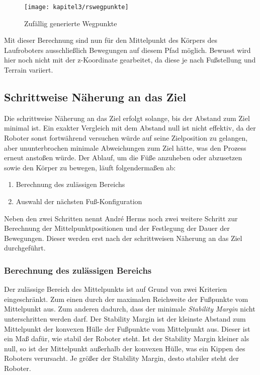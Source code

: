 \begin{figure}[t]
  \centering
  \texttt{[image: kapitel3/rswegpunkte]}
  \caption{Zufällig generierte Wegpunkte}
  \label{Kap3:RSWegpunkte}
\end{figure}

Mit dieser Berechnung sind nun für den Mittelpunkt des Körpers des Laufroboters ausschließlich Bewegungen auf diesem Pfad möglich. Bewusst wird hier noch nicht mit der z-Koordinate gearbeitet, da diese je nach Fußstellung und Terrain variiert.

\subsection{Schrittweise Näherung an das Ziel}

Die schrittweise Näherung an das Ziel erfolgt solange, bis der Abstand zum Ziel minimal ist. Ein exakter Vergleich mit dem Abstand null ist nicht effektiv, da der Roboter sonst fortwährend versuchen würde auf seine Zielposition zu gelangen, aber ununterbrochen minimale Abweichungen zum Ziel hätte, was den Prozess erneut anstoßen würde. Der Ablauf, um die Füße anzuheben oder abzusetzen sowie den Körper zu bewegen, läuft folgendermaßen ab:
\begin{enumerate}
  \item Berechnung des zulässigen Bereichs
  \item Auswahl der nächsten Fuß-Konfiguration
\end{enumerate}

Neben den zwei Schritten nennt André Herms \autocite{herms2004} noch zwei weitere Schritt zur Berechnung der Mittelpunktpositionen und der Festlegung der Dauer der Bewegungen. Dieser werden erst nach der schrittweisen Näherung an das Ziel durchgeführt.

\subsubsection{Berechnung des zulässigen Bereichs}

Der zulässige Bereich des Mittelpunkts ist auf Grund von zwei Kriterien eingeschränkt. Zum einen durch der maximalen Reichweite der Fußpunkte vom Mittelpunkt aus. Zum anderen dadurch, dass der minimale \emph{Stability Margin} nicht unterschritten werden darf. Der Stability Margin ist der kleinste Abstand zum Mittelpunkt der konvexen Hülle der Fußpunkte vom Mittelpunkt aus. Dieser ist ein Maß dafür, wie stabil der Roboter steht. Ist der Stability Margin kleiner als null, so ist der Mittelpunkt außerhalb der konvexen Hülle, was ein Kippen des Roboters verursacht. Je größer der Stability Margin, desto stabiler steht der Roboter.

